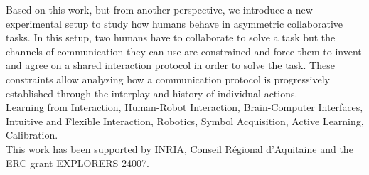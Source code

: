 \begin{vcenterpage}
Based on this work, but from another perspective, we introduce a new experimental setup to study how humans behave in asymmetric collaborative tasks. In this setup, two humans have to collaborate to solve a task but the channels of communication they can use are constrained and force them to invent and agree on a shared interaction protocol in order to solve the task. These constraints allow analyzing how a communication protocol is progressively established through the interplay and history of individual actions.\\

 Learning from Interaction, Human-Robot Interaction, Brain-Computer Interfaces, Intuitive and Flexible Interaction, Robotics, Symbol Acquisition, Active Learning, Calibration.\\

This work has been supported by INRIA, Conseil R\'egional d'Aquitaine and the ERC grant EXPLORERS 24007.

\end{vcenterpage}